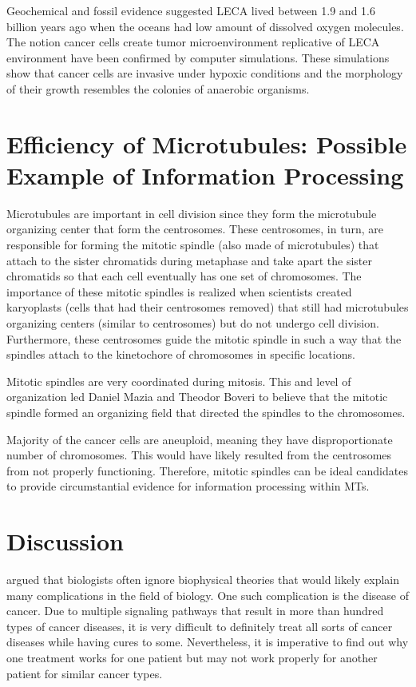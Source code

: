 \documentclass[letterpaper,final,times]{cas-dc}
\numberwithin{equation}{section}
\begin{document}
Geochemical and fossil evidence suggested LECA lived between 1.9 and 1.6 billion years ago when the oceans had low amount of dissolved oxygen molecules. The notion cancer cells create tumor microenvironment replicative of LECA environment have been confirmed by computer simulations. These simulations show that cancer cells are invasive under hypoxic conditions\citep{110} and the morphology of their growth resembles the colonies of anaerobic organisms\citep{111}.

\section{Efficiency of Microtubules: Possible Example of Information Processing}
Microtubules are important in cell division since they form the microtubule organizing center that form the centrosomes. These centrosomes, in turn, are responsible for forming the mitotic spindle (also made of microtubules) that attach to the sister chromatids during metaphase and take apart the sister chromatids so that each cell eventually has one set of chromosomes. The importance of these mitotic spindles is realized when scientists created karyoplasts (cells that had their centrosomes removed) that still had microtubules organizing centers (similar to centrosomes) but do not undergo cell division\citep{6}. Furthermore, these centrosomes guide the mitotic spindle in such a way that the spindles attach to the kinetochore of chromosomes in specific locations.

Mitotic spindles are very coordinated during mitosis. This and level of organization led Daniel Mazia and Theodor Boveri to believe\citep{3} that the mitotic spindle formed an organizing field that directed the spindles to the chromosomes.

Majority of the cancer cells are aneuploid, meaning they have disproportionate number of chromosomes. This would have likely resulted from the centrosomes from not properly functioning. Therefore, mitotic spindles can be ideal candidates to provide circumstantial evidence for information processing within MTs.

\section{Discussion}\noindent
\citet{112} argued that biologists often ignore biophysical theories that would likely explain many complications in the field of biology. One such complication is the disease of cancer. Due to multiple signaling pathways that result in more than hundred types of cancer diseases, it is very difficult to definitely treat all sorts of cancer diseases while having cures to some. Nevertheless, it is imperative to find out why one treatment works for one patient but may not work properly for another patient for similar cancer types.
\end{document}
